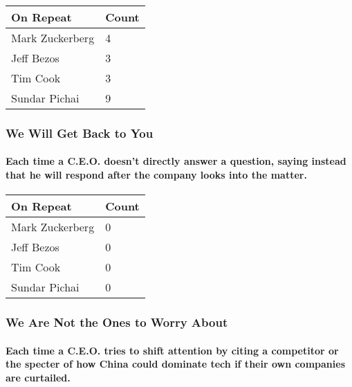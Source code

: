 \begin{longtable}[]{@{}ll@{}}
\toprule
\textbf{On Repeat} & \textbf{Count}\tabularnewline
\midrule
\endhead
Mark Zuckerberg & 4\tabularnewline
Jeff Bezos & 3\tabularnewline
Tim Cook & 3\tabularnewline
Sundar Pichai & 9\tabularnewline
\bottomrule
\end{longtable}

\hypertarget{we-will-get-back-to-you}{%
\subsubsection{We Will Get Back to You}\label{we-will-get-back-to-you}}

\hypertarget{each-time-a-ceo-doesnt-directly-answer-a-question-saying-instead-that-he-will-respond-after-the-company-looks-into-the-matter}{%
\paragraph{Each time a C.E.O. doesn't directly answer a question, saying
instead that he will respond after the company looks into the
matter.}\label{each-time-a-ceo-doesnt-directly-answer-a-question-saying-instead-that-he-will-respond-after-the-company-looks-into-the-matter}}

\begin{longtable}[]{@{}ll@{}}
\toprule
\textbf{On Repeat} & \textbf{Count}\tabularnewline
\midrule
\endhead
Mark Zuckerberg & 0\tabularnewline
Jeff Bezos & 0\tabularnewline
Tim Cook & 0\tabularnewline
Sundar Pichai & 0\tabularnewline
\bottomrule
\end{longtable}

\hypertarget{we-are-not-the-ones-to-worry-about}{%
\subsubsection{We Are Not the Ones to Worry
About}\label{we-are-not-the-ones-to-worry-about}}

\hypertarget{each-time-a-ceo-tries-to-shift-attention-by-citing-a-competitor-or-the-specter-of-how-china-could-dominate-tech-if-their-own-companies-are-curtailed}{%
\paragraph{Each time a C.E.O. tries to shift attention by citing a
competitor or the specter of how China could dominate tech if their own
companies are
curtailed.}\label{each-time-a-ceo-tries-to-shift-attention-by-citing-a-competitor-or-the-specter-of-how-china-could-dominate-tech-if-their-own-companies-are-curtailed}}

